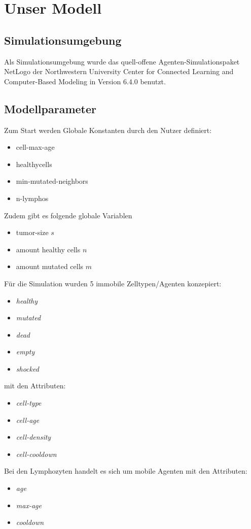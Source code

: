\documentclass[conference]{IEEEtran}
\begin{document}
\section{Unser Modell}
\subsection{Simulationsumgebung}
Als Simulationsumgebung wurde das quell-offene Agenten-Simulationspaket NetLogo der Northwestern University Center for Connected Learning and Computer-Based Modeling in Version 6.4.0 benutzt.

\subsection{Modellparameter}

Zum Start werden Globale Konstanten durch den Nutzer definiert:
\begin{itemize}
	\item cell-max-age
	\item healthycells
	\item min-mutated-neighbors
	\item n-lymphos
\end{itemize}

Zudem gibt es folgende globale Variablen
\begin{itemize}
	\item tumor-size \(s\)
	\item amount healthy cells \(n\)
	\item amount mutated cells \(m\)
\end{itemize} 
\vspace{5mm}
Für die Simulation wurden 5 immobile Zelltypen/Agenten konzepiert:
\begin{itemize}
	\item \emph{healthy} 
	\item \emph{mutated}
	\item \emph{dead}
	\item \emph{empty}
	\item \emph{shocked} 
\end{itemize}
mit den Attributen:
\begin{itemize}
	\item \emph{cell-type}
	\item \emph{cell-age}
	\item \emph{cell-density}
	\item \emph{cell-cooldown}
\end{itemize}
\vspace{5mm}
Bei den Lymphozyten handelt es sich um mobile Agenten mit den Attributen:
\begin{itemize}
	\item \emph{age}
	\item \emph{max-age}
	\item \emph{cooldown}
\end{itemize}
\end{document}

